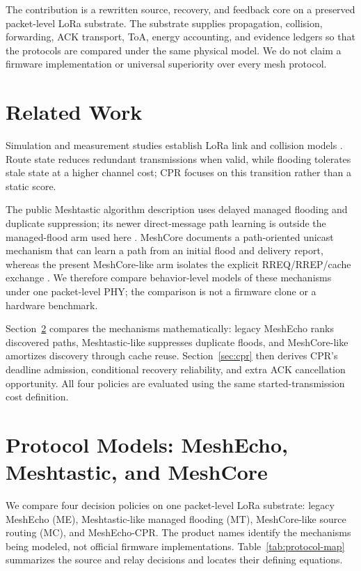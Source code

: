 \documentclass[conference,letterpaper,10pt]{IEEEtran}
\begin{document}
The contribution is a rewritten source, recovery, and feedback core on a
preserved packet-level LoRa substrate. The substrate supplies propagation,
collision, forwarding, ACK transport, ToA, energy accounting, and evidence
ledgers so that the protocols are compared under the same physical model. We
do not claim a firmware implementation or universal superiority over every
mesh protocol.

\section{Related Work}
Simulation and measurement studies establish LoRa link and collision models
\cite{to2018lorans3}. Route state reduces
redundant transmissions when valid, while flooding tolerates stale state at a
higher channel cost; CPR focuses on this transition rather than a static score.

The public Meshtastic algorithm description uses delayed managed flooding and
duplicate suppression; its newer direct-message path learning is outside the
managed-flood arm used here \cite{meshtasticdocs}. MeshCore documents a
path-oriented unicast mechanism that can learn a path from an initial flood and
delivery report, whereas the present MeshCore-like arm isolates the explicit
RREQ/RREP/cache exchange \cite{meshcore}. We therefore compare behavior-level
models of these mechanisms under one packet-level PHY; the comparison is not a
firmware clone or a hardware benchmark.

Section~\ref{sec:models} compares the mechanisms mathematically: legacy
MeshEcho ranks discovered paths, Meshtastic-like suppresses duplicate
floods, and MeshCore-like amortizes discovery through cache reuse.
Section~\ref{sec:cpr} then derives CPR's deadline admission, conditional
recovery reliability, and extra ACK cancellation opportunity. All four
policies are evaluated using the same started-transmission cost definition.

\section{Protocol Models: MeshEcho, Meshtastic, and MeshCore}
\label{sec:models}
We compare four decision policies on one packet-level LoRa substrate:
legacy MeshEcho (ME), Meshtastic-like managed flooding (MT), MeshCore-like
source routing (MC), and MeshEcho-CPR. The product names identify the mechanisms
being modeled, not official firmware implementations. Table~\ref{tab:protocol-map}
summarizes the source and relay decisions and locates their defining equations.
\end{document}
